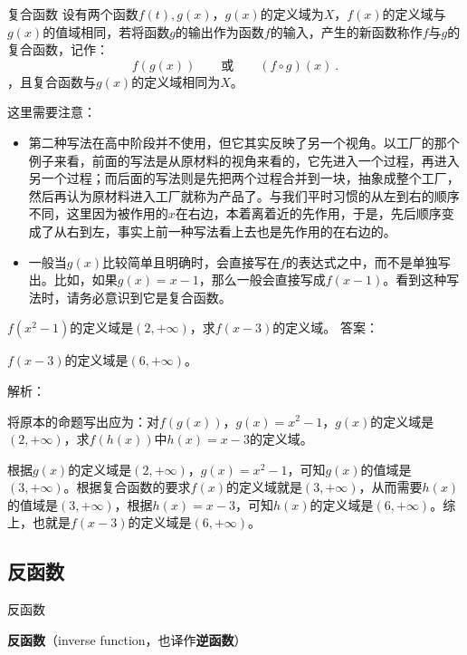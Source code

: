 \begin{definition}{复合函数}
设有两个函数$f(t),g(x)$，$g(x)$的定义域为$X$，$f(x)$的定义域与$g(x)$的值域相同，若将函数$g$的输出作为函数$f$的输入，产生的新函数称作$f$与$g$的复合函数，记作：
\begin{equation}
f(g(x))\qquad\text{或}\qquad(f \circ g)(x)~.
\end{equation}
，且复合函数与$g(x)$的定义域相同为$X$。
\end{definition}

这里需要注意：
\begin{itemize}
\item 第二种写法在高中阶段并不使用，但它其实反映了另一个视角。以工厂的那个例子来看，前面的写法是从原材料的视角来看的，它先进入一个过程，再进入另一个过程；而后面的写法则是先把两个过程合并到一块，抽象成整个工厂，然后再认为原材料进入工厂就称为产品了。与我们平时习惯的从左到右的顺序不同，这里因为被作用的$x$在右边，本着离着近的先作用，于是，先后顺序变成了从右到左，事实上前一种写法看上去也是先作用的在右边的。
\item 一般当$g(x)$比较简单且明确时，会直接写在$f$的表达式之中，而不是单独写出。比如，如果$g(x)=x-1$，那么一般会直接写成$f(x-1)$。看到这种写法时，请务必意识到它是复合函数。
\end{itemize}

\begin{exercise}{$f(x^2-1)$的定义域是$(2,+\infty)$，求$f(x-3)$的定义域。}
答案：

$f(x-3)$的定义域是$(6,+\infty)$。

解析：

将原本的命题写出应为：对$f(g(x))$，$g(x)=x^2-1$，$g(x)$的定义域是$(2,+\infty)$，求$f(h(x))$中$h(x)=x-3$的定义域。

根据$g(x)$的定义域是$(2,+\infty)$，$g(x)=x^2-1$，可知$g(x)$的值域是$(3,+\infty)$。根据复合函数的要求$f(x)$的定义域就是$(3,+\infty)$，从而需要$h(x)$的值域是$(3,+\infty)$，根据$h(x)=x-3$，可知$h(x)$的定义域是$(6,+\infty)$。综上，也就是$f(x-3)$的定义域是$(6,+\infty)$。

\end{exercise}

\subsection{反函数}

\begin{definition}{反函数}

\textbf{反函数}（inverse function，也译作\textbf{逆函数}）

\end{definition}

